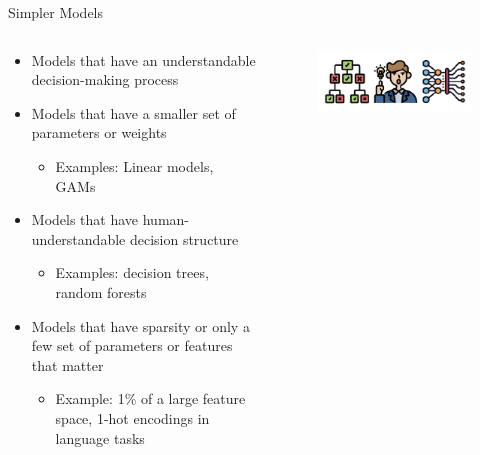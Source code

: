 \documentclass[11pt,compress,t,notes=noshow, aspectratio=169, xcolor=table]{beamer}
\begin{document}
\begin{frame}{Simpler Models}
    \begin{columns}
    \begin{column}{0.5\textwidth}
    \begin{itemize}
        \item Models that have an understandable decision-making process
        \item Models that have a smaller set of parameters or weights
        \begin{itemize}
            \item Examples: Linear models, GAMs
        \end{itemize}
        \item Models that have human-understandable decision structure
        \begin{itemize}
            \item Examples: decision trees, random forests
        \end{itemize}
        \item Models that have sparsity or only a few set of parameters or features that matter
        \begin{itemize}
            \item Example: 1\% of a large feature space, 1-hot encodings in language tasks
        \end{itemize}
    \end{itemize}
    \end{column}
    \begin{column}{0.5\textwidth}
    \begin{figure}
        \centering
        \includegraphics[scale=.7]{bild2}
    \end{figure}
    \end{column}
    \end{columns}
\end{frame}
\end{document}
